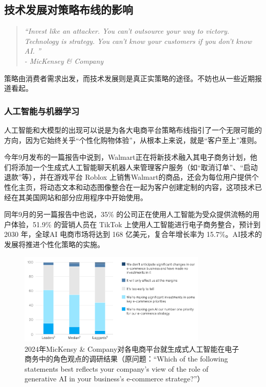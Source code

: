 \documentclass[12pt]{ctexart}
\begin{document}
\subsection{技术发展对策略布线的影响}

\begin{quote}
    \textit{“Invest like an attacker. You can't outsource your way to victory. Technology is strategy. You can't know your customers if you don't know AI. ”} \\
    \raggedleft \textit{- MicKensey \& Company \cite{42}}
\end{quote}

策略由消费者需求出发，而技术发展则是真正实策略的途径。不妨也从一些近期报道看起。

\subsubsection{人工智能与机器学习}
人工智能和大模型的出现可以说是为各大电商平台策略布线指引了一个无限可能的方向，因为它始终关乎“个性化购物体验”，从根本上来说，就是“客户至上”准则。

今年9月发布的一篇报告\cite{40}中说到，Walmart正在将新技术融入其电子商务计划，他们将添加一个生成式人工智能聊天机器人来管理客户服务（如“取消订单”、“启动退款”等），并在游戏平台 Roblox 上销售Walmart的商品，还会为每位用户提供个性化主页，将动态文本和动态图像整合在一起为客户创建定制的内容，这项技术已经在其美国网站和部分应用程序中开始使用。

同年9月的另一篇报告\cite{41}中也说，35\% 的公司正在使用人工智能为受众提供流畅的用户体验，51.9\% 的营销人员在 TikTok 上使用人工智能进行电子商务整合，预计到 2030 年，全球AI 电商市场将达到 168 亿美元，复合年增长率为 15.7\%。AI技术的发展将推进个性化策略的实施。

\begin{figure}[htbp!]
    \centering
    \includegraphics[width=0.8\textwidth]{Images/23.png}
    \caption{2024年MicKensy \& Company对各电商平台就生成式人工智能在电子商务中的角色观点的调研结果（原问题：“Which of the following statements best reflects your company's view of the role of generative AI in your business's e-commerce stratege?”）\cite{42}}
    \label{auto}
\end{figure}
\end{document}
